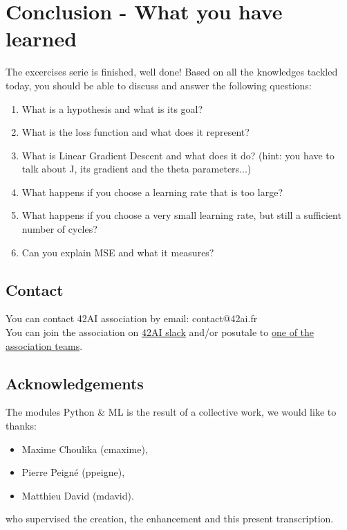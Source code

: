 \documentclass{42-en}
\begin{document}

\newpage

\chapter{Conclusion - What you have learned}

The excercises serie is finished, well done!
Based on all the knowledges tackled today, you should be able to discuss and answer the following questions:

\begin{enumerate}
  \item What is a hypothesis and what is its goal?  
  \item What is the loss function and what does it represent?   
  \item What is Linear Gradient Descent and what does it do?  
  (hint: you have to talk about J, its gradient and the theta parameters...)  
  \item What happens if you choose a learning rate that is too large?
  \item What happens if you choose a very small learning rate, but still a sufficient number of cycles?
  \item Can you explain MSE and what it measures?
\end{enumerate}



\newpage

\section*{Contact}
You can contact 42AI association by email: contact@42ai.fr\\
You can join the association on \href{https://join.slack.com/t/42-ai/shared_invite/zt-ebccw5r7-YPkDM6xOiYRPjqJXkrKgcA}{42AI slack}
and/or posutale to \href{https://forms.gle/VAFuREWaLmaqZw2D8}{one of the association teams}.

\section*{Acknowledgements}
The modules Python \& ML is the result of a collective work, we would like to thanks:
\begin{itemize}
  \item Maxime Choulika (cmaxime),
  \item Pierre Peigné (ppeigne),
  \item Matthieu David (mdavid).
\end{itemize}
who supervised the creation, the enhancement and this present transcription.
\end{document}

